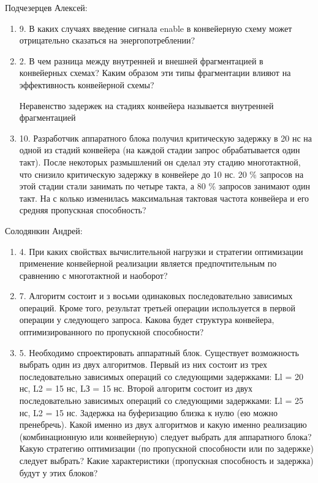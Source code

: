 \documentclass[a4paper,14pt]{article}
\begin{document}
	Подчезерцев Алексей:
	
	\begin{enumerate}
		\item 9. В каких случаях введение сигнала enable в конвейерную схему может отрицательно сказаться на энергопотреблении? 
	
		\item 2. В чем разница между внутренней и внешней фрагментацией в конвейерных схемах?
		Каким образом эти типы фрагментации влияют на эффективность конвейерной	схемы?
		
		Неравенство задержек на стадиях конвейера называется внутренней фрагментацией

		\item 10. Разработчик аппаратного блока получил критическую задержку в 20 нс на одной из стадий конвейера (на каждой стадии запрос обрабатывается один такт). После некоторых размышлений он сделал эту стадию многотактной, что снизило критическую задержку в конвейере до 10 нс. 20 \% запросов на этой стадии стали занимать по четыре такта, а 80 \% запросов занимают один такт. На с колько	изменилась максимальная тактовая частота конвейера и его средняя пропускная способность?

	\end{enumerate}
	
	Солодянкин Андрей:

	\begin{enumerate}
		\item 4. При каких свойствах вычислительной нагрузки и стратегии оптимизации применение	конвейерной реализации является предпочтительным по сравнению с многотактной и наоборот?
		
		\item 7. Алгоритм состоит и з восьми одинаковых последовательно зависимых операций.	Кроме того, результат третьей операции используется в первой операции у следующего запроса. Какова будет структура конвейера, оптимизированного по пропускной способности?
	
		\item 5. Необходимо спроектировать аппаратный блок. Существует возможность выбрать один из двух алгоритмов. Первый из них состоит из трех последовательно зависимых операций со следующими задержками: Ll = 20 нс, L2 = 15 нс, LЗ = 15 нс. Второй	алгоритм состоит из двух последовательно зависимых операций со следующими задержками: Ll = 25 нс, L2 = 15 нс. Задержка на буферизацию близка к нулю (ею	можно пренебречь). Какой именно из двух алгоритмов и какую именно реализацию (комбинационную или конвейерную) следует выбрать для аппаратного блока? Какую стратегию оптимизации (по пропускной способности или по задержке) следует выбрать? Какие характеристики (пропускная способность и задержка) будут у этих	блоков?
		
	\end{enumerate}
	
\end{document}
